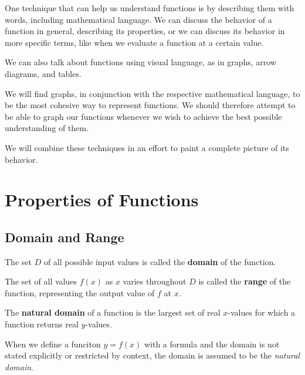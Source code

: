 One technique that can help us understand functions is by describing them with words,
including mathematical language.
We can discuss the behavior of a function in general,
describing its properties, or we can discuss its behavior in more specific terms,
like when we evaluate a function at a certain value.

We can also talk about functions using visual language, as in graphs, arrow diagrams, and tables.

We will find graphs, in conjunction with the respective mathematical language, to be the most cohesive way to represent functions.
We should therefore attempt to be able to graph our functions whenever we wish to achieve the best possible understanding of them.

We will combine these techniques in an effort to paint a complete picture of its behavior.

\section{Properties of Functions}


\subsection{Domain and Range}

\begin{defn}
  The set \(D\) of all possible input values is called the \textbf{domain} of the function.
\end{defn}

\begin{defn}
  The set of all values \(f(x)\) as \(x\) varies throughout \(D\) is called the \textbf{range} of the function, representing the output value of \(f\) at \(x\).
\end{defn}

\begin{defn}
   The \textbf{natural domain} of a function is the largest set of real \(x\)-values for which a function returns real \(y\)-values.
   \begin{remark}
     When we define a funciton \(y=f(x)\) with a formula and the domain is not stated explicitly or restricted by context, the domain is assumed to be the \emph{natural domain}.
   \end{remark}
\end{defn}

